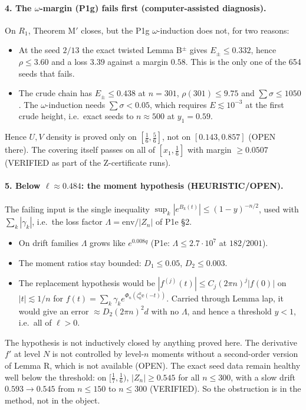 \documentclass[11pt]{article}
\theoremstyle{remark}\newtheorem{remark}[theorem]{Remark}
\newcommand{\e}{\mathrm{e}}
\begin{document}
\paragraph{4. The $\omega$-margin (P1g) fails first (computer-assisted diagnosis).} On $R_1$, Theorem M$'$ closes, but the P1g $\omega$-induction does not, for two reasons:
\begin{itemize}
\item At the seed $2/13$ the exact twisted Lemma B$^\pm$ gives $E_\pm\le0.332$, hence $\rho\le3.60$ and a loss $3.39$ against a margin $0.58$. This is the only one of the 654 seeds that fails.
\item The crude chain has $E_\pm\le0.438$ at $n=301$, $\rho(301)\le9.75$ and $\sum\sigma\le1050$. The $\omega$-induction needs $\sum\sigma<0.05$, which requires $E\lesssim10^{-3}$ at the first crude height, i.e.\ exact seeds to $n\approx500$ at $y_1=0.59$.
\end{itemize}
Hence $U,V$ density is proved only on $[\frac16,\frac56]$, not on $[0.143,0.857]$ (OPEN there). The covering itself passes on all of $[x_1,\frac16]$ with margin $\ge0.0507$ (VERIFIED as part of the Z-certificate runs).

\paragraph{5. Below $\ell\approx0.484$: the moment hypothesis (HEURISTIC/OPEN).} The failing input is the single inequality $\sup_k|e^{B_k(t)}|\le(1-y)^{-n/2}$, used with $\sum_k|\gamma_k|$, i.e.\ the loss factor $\Lambda=\mathrm{env}/|Z_n|$ of P1e \S2.
\begin{itemize}
\item On drift families $\Lambda$ grows like $e^{0.008q}$ (P1e: $\Lambda\le2.7\cdot10^7$ at $182/2001$).
\item The moment ratios stay bounded: $D_1\le0.05$, $D_2\le0.003$.
\item The replacement hypothesis would be $|f^{(j)}(t)|\le C_j(2\pi n)^j|f(0)|$ on $|t|\lesssim1/n$ for $f(t)=\sum_k\gamma_ke^{\Phi_n(\zeta_0^k\e(-t))}$. Carried through Lemma lap, it would give an error $\approx D_2(2\pi n)^2d$ with no $\Lambda$, and hence a threshold $y<1$, i.e.\ all of $\ell>0$.
\end{itemize}
The hypothesis is not inductively closed by anything proved here. The derivative $f'$ at level $N$ is not controlled by level-$n$ moments without a second-order version of Lemma R, which is not available (OPEN).
The exact seed data remain healthy well below the threshold: on $[\frac17,\frac16)$, $|Z_n|\ge0.545$ for all $n\le300$, with a slow drift $0.593\to0.545$ from $n\le150$ to $n\le300$ (VERIFIED). So the obstruction is in the method, not in the object.
\end{document}
